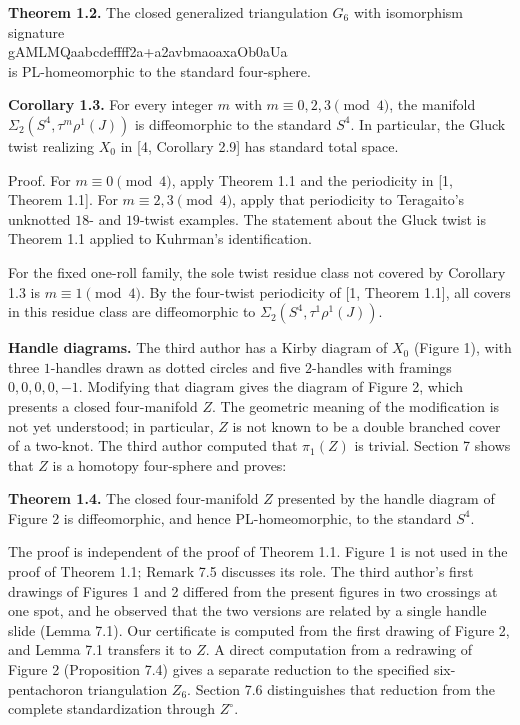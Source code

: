 \documentclass[11pt,letterpaper]{article}
\begin{document}
\medskip\noindent\textbf{Theorem 1.2.} The closed generalized triangulation $G_6$ with isomorphism signature \hfil\\\mbox{\small\ttfamily gAMLMQaabcdeffff2a+a2avbmaoaxaOb0aUa}\hfil\\ is PL-homeomorphic to the standard four-sphere.

\medskip\noindent\textbf{Corollary 1.3.} For every integer $m$ with $m\equiv0,2,3\pmod4$, the manifold $\Sigma_2(S^4,\tau^m\rho^1(J))$ is diffeomorphic to the standard $S^4$. In particular, the Gluck twist realizing $X_0$ in [4, Corollary 2.9] has standard total space.

Proof. For $m\equiv0\pmod4$, apply Theorem 1.1 and the periodicity in [1, Theorem 1.1]. For $m\equiv2,3\pmod4$, apply that periodicity to Teragaito's unknotted $18$- and $19$-twist examples. The statement about the Gluck twist is Theorem 1.1 applied to Kuhrman's identification.

For the fixed one-roll family, the sole twist residue class not covered by Corollary 1.3 is $m\equiv1\pmod4$. By the four-twist periodicity of [1, Theorem 1.1], all covers in this residue class are diffeomorphic to $\Sigma_2(S^4,\tau^1\rho^1(J))$.

\medskip\noindent\textbf{Handle diagrams.} The third author has a Kirby diagram of $X_0$ (Figure 1), with three $1$-handles drawn as dotted circles and five $2$-handles with framings $0,0,0,0,-1$. Modifying that diagram gives the diagram of Figure 2, which presents a closed four-manifold $Z$. The geometric meaning of the modification is not yet understood; in particular, $Z$ is not known to be a double branched cover of a two-knot. The third author computed that $\pi_1(Z)$ is trivial. Section 7 shows that $Z$ is a homotopy four-sphere and proves:

\medskip\noindent\textbf{Theorem 1.4.} The closed four-manifold $Z$ presented by the handle diagram of Figure 2 is diffeomorphic, and hence PL-homeomorphic, to the standard $S^4$.

The proof is independent of the proof of Theorem 1.1. Figure 1 is not used in the proof of Theorem 1.1; Remark 7.5 discusses its role. The third author's first drawings of Figures 1 and 2 differed from the present figures in two crossings at one spot, and he observed that the two versions are related by a single handle slide (Lemma 7.1). Our certificate is computed from the first drawing of Figure 2, and Lemma 7.1 transfers it to $Z$. A direct computation from a redrawing of Figure 2 (Proposition 7.4) gives a separate reduction to the specified six-pentachoron triangulation $Z_6$. Section 7.6 distinguishes that reduction from the complete standardization through $Z^\circ$.
\end{document}
